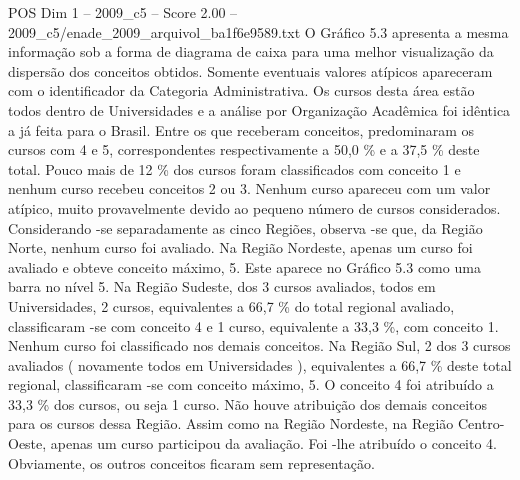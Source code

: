 \begin{textsample}{POS Dim 1 – 2009\_c5 – Score 2.00 – 2009\_c5/enade\_2009\_arquivol\_ba1f6e9589.txt}
O Gráfico 5.3 apresenta a mesma informação sob a forma de diagrama de caixa para uma melhor visualização da dispersão dos conceitos obtidos.
Somente eventuais valores atípicos apareceram com o identificador da Categoria Administrativa.
Os cursos desta área estão todos dentro de Universidades e a análise por Organização Acadêmica foi idêntica a já feita para o Brasil.
Entre os que receberam conceitos, predominaram os cursos com 4 e 5, correspondentes respectivamente a 50,0 \% e a 37,5 \% deste total.
Pouco mais de 12 \% dos cursos foram classificados com conceito 1 e nenhum curso recebeu conceitos 2 ou 3.
Nenhum curso apareceu com um valor atípico, muito provavelmente devido ao pequeno número de cursos considerados.
Considerando -se separadamente as cinco Regiões, observa -se que, da Região Norte, nenhum curso foi avaliado.
Na Região Nordeste, apenas um curso foi avaliado e obteve conceito máximo, 5.
Este aparece no Gráfico 5.3 como uma barra no nível 5.
Na Região Sudeste, dos 3 cursos avaliados, todos em Universidades, 2 cursos, equivalentes a 66,7 \% do total regional avaliado, classificaram -se com conceito 4 e 1 curso, equivalente a 33,3 \%, com conceito 1.
Nenhum curso foi classificado nos demais conceitos.
Na Região Sul, 2 dos 3 cursos avaliados ( novamente todos em Universidades ), equivalentes a 66,7 \% deste total regional, classificaram -se com conceito máximo, 5.
O conceito 4 foi atribuído a 33,3 \% dos cursos, ou seja 1 curso.
Não houve atribuição dos demais conceitos para os cursos dessa Região.
Assim como na Região Nordeste, na Região Centro-Oeste, apenas um curso participou da avaliação.
Foi -lhe atribuído o conceito 4.
Obviamente, os outros conceitos ficaram sem representação.

\end{textsample}
